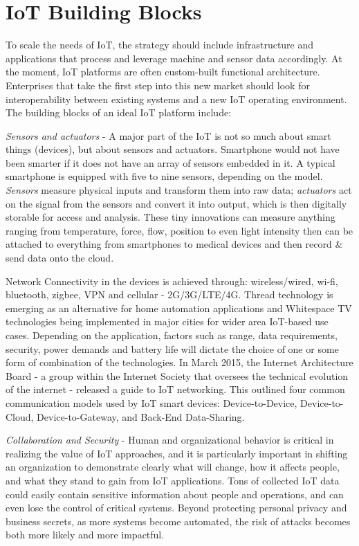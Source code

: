 \documentclass[sigconf]{acmart}
\begin{document}
\section{IoT Building Blocks}

To scale the needs of IoT, the strategy should include infrastructure and applications that process and leverage machine and sensor data accordingly. At the moment, IoT platforms are often custom-built functional architecture. Enterprises that take the first step into this new market should look for interoperability between existing systems and a new IoT operating environment. The building blocks of an ideal IoT platform include:

{\em Sensors and actuators} -  A major part of the IoT is not so much about smart things (devices), but about sensors and actuators. Smartphone would not have been smarter if it does not have an array of sensors embedded in it. A typical smartphone is equipped with five to nine sensors, depending on the model. {\em Sensors} measure physical inputs and transform them into raw data; {\em actuators} act on the signal from the sensors and convert it into output, which is then digitally storable for access and analysis.  These tiny innovations can measure anything ranging from temperature, force, flow, position to even light intensity then can be attached to everything from smartphones to medical devices and then record \& send data onto the cloud\cite{4_Wiley_Book}. 

Network Connectivity in the devices is achieved through: wireless/wired, wi-fi, bluetooth, zigbee, VPN and cellular - 2G/3G/LTE/4G. Thread technology is emerging as an alternative for home automation applications and Whitespace TV technologies being implemented in major cities for wider area IoT-based use cases. Depending on the application, factors such as range, data requirements, security, power demands and battery life will dictate the choice of one or some form of combination of the technologies. In March 2015, the Internet Architecture Board - a group within the Internet Society that oversees the technical evolution of the internet - released a guide to IoT networking. This outlined four common communication models used by IoT smart devices: Device-to-Device, Device-to-Cloud, Device-to-Gateway, and Back-End Data-Sharing\cite{5_Internet_Society}.

{\em Collaboration and Security} - Human and organizational behavior is critical in realizing the value of IoT approaches, and it is particularly important in shifting an organization to demonstrate clearly what will change, how it affects people, and what they stand to gain from IoT applications. Tons of collected IoT data could easily contain sensitive information about people and operations, and can even lose the control of critical systems. Beyond protecting personal privacy and business secrets, as more systems become automated, the risk of attacks becomes both more likely and more impactful. 
\end{document}
